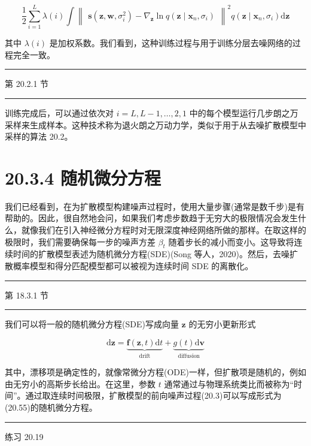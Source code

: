 \documentclass[10pt]{report}
\newcommand{\HRule}{\begin{center}\rule{0.9\linewidth}{0.2mm}\end{center}}
\begin{document}
\[
\frac{1}{2}\mathop{\sum }\limits_{{i = 1}}^{L}\lambda \left( i\right) \int {\begin{Vmatrix}\mathbf{s}\left( \mathbf{z},\mathbf{w},{\sigma }_{i}^{2}\right)  - {\nabla }_{\mathbf{z}}\ln q\left( \mathbf{z} \mid  {\mathbf{x}}_{n},{\sigma }_{i}\right) \end{Vmatrix}}^{2}q\left( {\mathbf{z} \mid  {\mathbf{x}}_{n},{\sigma }_{i}}\right) \mathrm{d}\mathbf{z} \tag{20.54}
\]

其中 \(\lambda \left( i\right)\) 是加权系数。我们看到，这种训练过程与用于训练分层去噪网络的过程完全一致。

\HRule

第 20.2.1 节

\HRule

训练完成后，可以通过依次对 \(i = L,L - 1,\ldots ,2,1\) 中的每个模型运行几步朗之万采样来生成样本。这种技术称为退火朗之万动力学，类似于用于从去噪扩散模型中采样的算法 20.2。

\section*{20.3.4 随机微分方程}

我们已经看到，在为扩散模型构建噪声过程时，使用大量步骤(通常是数千步)是有帮助的。因此，很自然地会问，如果我们考虑步数趋于无穷大的极限情况会发生什么，就像我们在引入神经微分方程时对无限深度神经网络所做的那样。在取这样的极限时，我们需要确保每一步的噪声方差 \({\beta }_{t}\) 随着步长的减小而变小。这导致将连续时间的扩散模型表述为随机微分方程(SDE)(Song 等人，2020)。然后，去噪扩散概率模型和得分匹配模型都可以被视为连续时间 SDE 的离散化。

\HRule

第 18.3.1 节

\HRule

我们可以将一般的随机微分方程(SDE)写成向量 \(\mathbf{z}\) 的无穷小更新形式

\[
\mathrm{d}\mathbf{z} = \underset{\text{ drift }}{\underbrace{\mathbf{f}\left( {\mathbf{z},t}\right) \mathrm{d}t}} + \underset{\text{ diffusion }}{\underbrace{g\left( t\right) \mathrm{d}\mathbf{v}}} \tag{20.55}
\]

其中，漂移项是确定性的，就像常微分方程(ODE)一样，但扩散项是随机的，例如由无穷小的高斯步长给出。在这里，参数 \(t\) 通常通过与物理系统类比而被称为“时间”。通过取连续时间极限，扩散模型的前向噪声过程(20.3)可以写成形式为(20.55)的随机微分方程。

\HRule

练习 20.19
\end{document}
